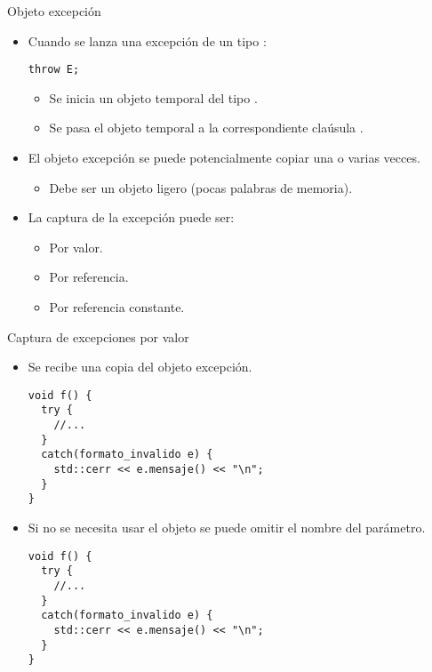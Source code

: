 \begin{frame}[t,fragile]{Objeto excepción}
\begin{itemize}
  \item Cuando se lanza una excepción de un tipo :
\begin{lstlisting}
throw E;
\end{lstlisting}
    \begin{itemize}
      \item Se inicia un objeto temporal del tipo .
      \item Se pasa el objeto temporal a la correspondiente claúsula .
    \end{itemize}

  \item El objeto excepción se puede potencialmente copiar una o varias vecces.
    \begin{itemize}
      \item Debe ser un objeto ligero (pocas palabras de memoria).
    \end{itemize}

  \item La captura de la excepción puede ser:
    \begin{itemize}
      \item Por valor.
      \item Por referencia.
      \item Por referencia constante.
    \end{itemize}

\end{itemize}
\end{frame}

\begin{frame}[t,fragile]{Captura de excepciones por valor}
\begin{itemize}
  \item Se recibe una copia del objeto excepción.
\begin{lstlisting}[basicstyle=\tiny]
void f() {
  try {
    //...
  }
  catch(formato_invalido e) {
    std::cerr << e.mensaje() << "\n";
  }
}
\end{lstlisting}

  \item Si no se necesita usar el objeto se puede omitir el nombre del parámetro.
\begin{lstlisting}[basicstyle=\tiny]
void f() {
  try {
    //...
  }
  catch(formato_invalido e) {
    std::cerr << e.mensaje() << "\n";
  }
}
\end{lstlisting}
\end{itemize}
\end{frame}

